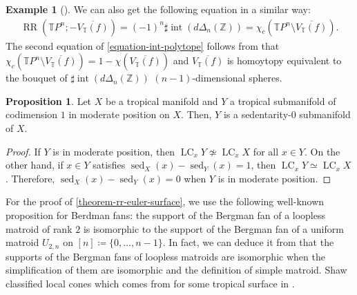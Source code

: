 \documentclass[a4paper,dvipdfmx,reqno,12pt]{amsart}
\theoremstyle{definition}
\newtheorem{example}[theorem]{Example}
\newtheorem{proposition}[theorem]{Proposition}
\newcommand{\deq}{\coloneqq}
\newcommand{\opn}[1]{\operatorname{#1}}
\numberwithin{equation}{section}
\begin{document}
\begin{example}[{\cite[Example 2.11]{demedrano2023chern}}]
We can also get the following equation in a similar way:
\begin{align}
\label{equation-int-polytope}
\opn{RR}(\mathbb{T}P^{n};-\overline{V_{\mathbb{T}}(f)})=
(-1)^{n}\sharp \opn{int}(d\Delta_n(\mathbb{Z}))=
\chi_{c}(\mathbb{T}P^{n}\setminus
\overline{V_{\mathbb{T}}(f)}).
\end{align}
The second equation of \eqref{equation-int-polytope}
follows from that 
$\chi_{c}(\mathbb{T}P^{n}\setminus
\overline{V_{\mathbb{T}}(f)})
=1-\chi (\overline{V_{\mathbb{T}}(f)})$
and $\overline{V_{\mathbb{T}}(f)}$ is homoytopy 
equivalent to the bouquet
of $\sharp \opn{int}(d\Delta_n(\mathbb{Z}))$
$(n-1)$-dimensional spheres.
\end{example}

\begin{proposition}
Let $X$ be a tropical manifold and 
$Y$ a tropical submanifold of codimension $1$
in moderate position on $X$.
Then, $Y$ is a sedentarity-0 submanifold of $X$.
\end{proposition}
\begin{proof}
If $Y$ is in moderate position,
then $\opn{LC}_x Y\not \simeq \opn{LC}_x X$ for all 
$x \in Y$.
On the other hand, if $x \in Y$ satisfies 
$\opn{sed}_X(x)-\opn{sed}_Y(x)=1$, then
$\opn{LC}_x Y\simeq \opn{LC}_x X$.
Therefore, $\opn{sed}_X(x)-\opn{sed}_Y(x)=0$ when
$Y$ is in moderate position. 
\end{proof}
For the proof of \cref{theorem-rr-euler-surface}, we 
use the following well-known 
proposition for Berdman fans: 
the support of the Bergman fan of
a loopless matroid of rank $2$ 
is isomorphic to the support of the Bergman fan of
a uniform matroid $U_{2,n}$ on
$[n]\deq \{0,\ldots,n-1\}$.
In fact, we can deduce it from that 
the supports of the Bergman fans of
loopless matroids are isomorphic
when the simplification of them are isomorphic
and the definition of simple matroid.
Shaw classified local cones which comes from
for some tropical surface in
\cite[Corollary 2.4]{shaw2015tropical}.
\end{document}
